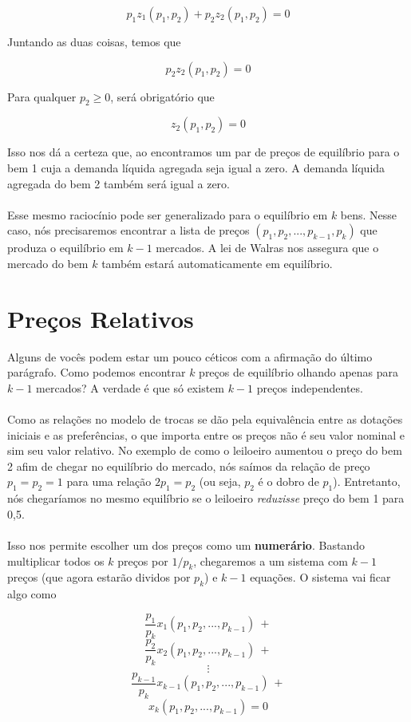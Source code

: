 \documentclass[a4paper,11pt,oneside]{book}
\theoremstyle{definition}
\theoremstyle{break}
\begin{document}
$$p_1 z_1(p_1,p_2) + p_2 z_2(p_1,p_2) = 0$$

Juntando as duas coisas, temos que

$$ p_2 z_2(p_1,p_2) = 0$$

Para qualquer $p_2 \geq 0$, será obrigatório que

$$z_2(p_1,p_2) = 0$$

Isso nos dá a certeza que, ao encontramos um par de preços de equilíbrio para o bem 1 cuja a demanda líquida agregada seja igual a zero. A demanda líquida agregada do bem 2 também será igual a zero.
\\~\\
Esse mesmo raciocínio pode ser generalizado para o equilíbrio em $k$ bens. Nesse caso, nós precisaremos encontrar a lista de preços $(p_1,p_2,...,p_{k-1},p_k)$ que produza o equilíbrio em $k - 1$ mercados. A lei de Walras nos assegura que o mercado do bem $k$ também estará automaticamente em equilíbrio.

\section{Preços Relativos}

Alguns de vocês podem estar um pouco céticos com a afirmação do último parágrafo. Como podemos encontrar $k$ preços de equilíbrio olhando apenas para $k - 1$ mercados? A verdade é que só existem $k - 1$ preços independentes. 
\\~\\
Como as relações no modelo de trocas se dão pela equivalência entre as dotações iniciais e as preferências, o que importa entre os preços não é seu valor nominal e sim seu valor relativo. No exemplo de como o leiloeiro aumentou o preço do bem 2 afim de chegar no equilíbrio do mercado, nós saímos da relação de preço $p_1 = p_2 = 1$ para uma relação $2p_1 = p_2$ (ou seja, $p_2$ é o dobro de $p_1$). Entretanto, nós chegaríamos no mesmo equilíbrio se o leiloeiro \textit{reduzisse} preço do bem 1 para 0,5.
\\~\\
Isso nos permite escolher um dos preços como um \textbf{numerário}. Bastando multiplicar todos os $k$ preços por $1/p_k$, chegaremos a um sistema com $k - 1$ preços (que agora estarão dividos por $p_k$) e $k - 1$ equações. O sistema vai ficar algo como

$$\frac{p_1}{p_k}x_1(p_1,p_2,...,p_{k-1}) \ + $$
$$\frac{p_2}{p_k}x_2(p_1,p_2,...,p_{k-1}) \ + $$ 
$$ \vdots $$
$$\frac{p_{k-1}}{p_k}x_{k - 1}(p_1,p_2,...,p_{k-1}) \ + $$
$$x_{k}(p_1,p_2,...,p_{k-1}) = 0$$
\end{document}
